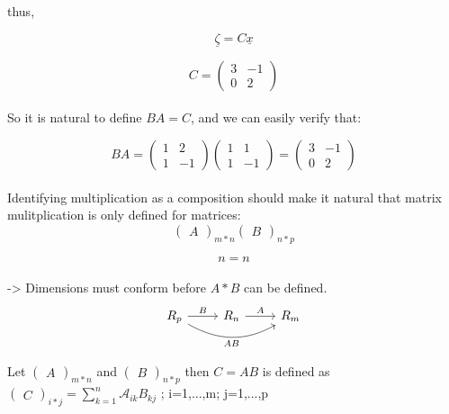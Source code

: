 \documentclass[]{article}
\begin{document}
thus,

\begin{equation}\label{eqn:matrix}\underline{\zeta}=C\underline{x}\end{equation}

\[C = \begin{pmatrix} 3 & -1 \\ 0 & 2 \end{pmatrix}\]\\

So it is natural to define \(BA=C\), and we can easily verify that:

\[BA = \begin{pmatrix} 1 & 2 \\ 1 & -1 \end{pmatrix}\begin{pmatrix} 1 & 1\\ 1 & -1 \end{pmatrix}=\begin{pmatrix} 3 & -1 \\ 0 & 2 \end{pmatrix}\]\\

Identifying multiplication as a composition should make it natural that
matrix mulitplication is only defined for matrices:\\

\[\begin{pmatrix}A\end{pmatrix}_{m*n} \begin{pmatrix}B\end{pmatrix}_{n*p}\]

\[n=n\]\\
 -\textgreater{} Dimensions must conform before \(A*B\) can be
defined.\\
 \[
  \begin{tikzcd}
R_{p}\ar[r,"B"]\ar[rr,out=-30,in=210,swap,"AB"] & R_{n}\ar[r,"A"] & R_{m}
\end{tikzcd}
\]

\begin{tcolorbox}[colback=green!5,colframe=red!40!black,title=Definition]
Let $\begin{pmatrix}A\end{pmatrix}_{m*n}$ and $\begin{pmatrix}B\end{pmatrix}_{n*p}$  then $C=AB$ is defined
as $\begin{pmatrix}C\end{pmatrix}_{i*j} = \sum\limits_{k=1}^n \mathcal A_{ik}B_{kj}$ ; i=1,...,m; j=1,...,p
\end{tcolorbox}
\end{document}
